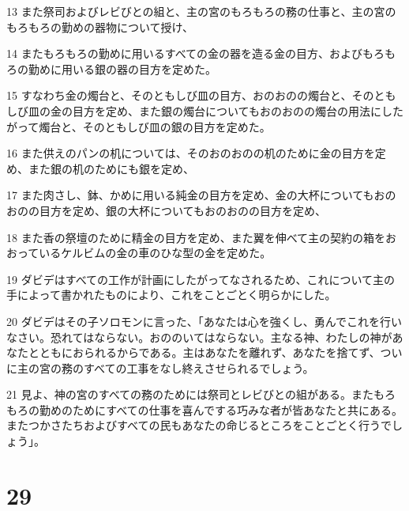 \par 13 また祭司およびレビびとの組と、主の宮のもろもろの務の仕事と、主の宮のもろもろの勤めの器物について授け、
\par 14 またもろもろの勤めに用いるすべての金の器を造る金の目方、およびもろもろの勤めに用いる銀の器の目方を定めた。
\par 15 すなわち金の燭台と、そのともしび皿の目方、おのおのの燭台と、そのともしび皿の金の目方を定め、また銀の燭台についてもおのおのの燭台の用法にしたがって燭台と、そのともしび皿の銀の目方を定めた。
\par 16 また供えのパンの机については、そのおのおのの机のために金の目方を定め、また銀の机のためにも銀を定め、
\par 17 また肉さし、鉢、かめに用いる純金の目方を定め、金の大杯についてもおのおのの目方を定め、銀の大杯についてもおのおのの目方を定め、
\par 18 また香の祭壇のために精金の目方を定め、また翼を伸べて主の契約の箱をおおっているケルビムの金の車のひな型の金を定めた。
\par 19 ダビデはすべての工作が計画にしたがってなされるため、これについて主の手によって書かれたものにより、これをことごとく明らかにした。
\par 20 ダビデはその子ソロモンに言った、「あなたは心を強くし、勇んでこれを行いなさい。恐れてはならない。おののいてはならない。主なる神、わたしの神があなたとともにおられるからである。主はあなたを離れず、あなたを捨てず、ついに主の宮の務のすべての工事をなし終えさせられるでしょう。
\par 21 見よ、神の宮のすべての務のためには祭司とレビびとの組がある。またもろもろの勤めのためにすべての仕事を喜んでする巧みな者が皆あなたと共にある。またつかさたちおよびすべての民もあなたの命じるところをことごとく行うでしょう」。

\chapter{29}

